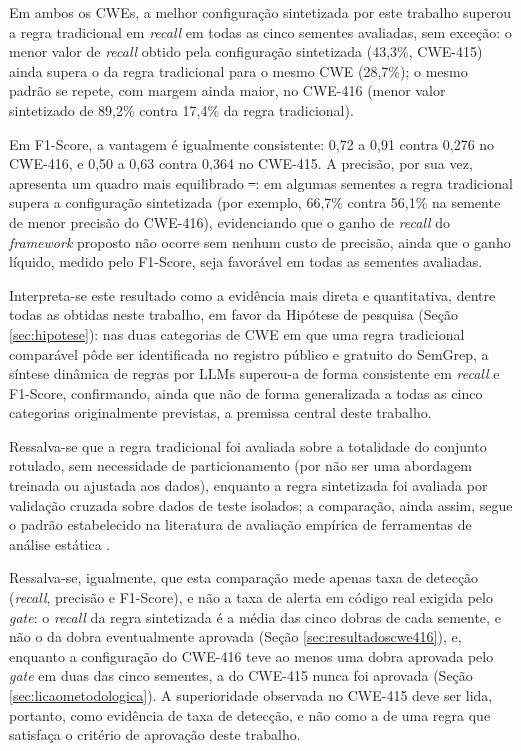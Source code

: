 \documentclass[
    12pt,                %
    openright,           %
    oneside,             %
    a4paper,             %
    english,             %
    brazil               %
]{abntex2}
\newcommand{\antigo}[1]{\sout{#1}}
\newcommand{\novo}[1]{{\color{red}#1}}
\begin{document}
\par
Em ambos os CWEs, a melhor configuração sintetizada por este trabalho superou a regra tradicional em \textit{recall} em todas as cinco sementes avaliadas, sem exceção: o menor valor de \textit{recall} obtido pela configuração sintetizada (43,3\%, CWE-415) ainda supera o da regra tradicional para o mesmo CWE (28,7\%); o mesmo padrão se repete, com margem ainda maior, no CWE-416 (menor valor sintetizado de 89,2\% contra 17,4\% da regra tradicional).
\par
Em F1-Score, a vantagem é igualmente consistente: 0,72 a 0,91 contra 0,276 no CWE-416, e 0,50 a 0,63 contra 0,364 no CWE-415.
A precisão, por sua vez, apresenta um quadro mais equilibrado\antigo{ --}\novo{:} em algumas sementes a regra tradicional supera a configuração sintetizada (por exemplo, 66,7\% contra 56,1\% na semente de menor precisão do CWE-416), evidenciando que o ganho de \textit{recall} do \textit{framework} proposto não ocorre sem nenhum custo de precisão, ainda que o ganho líquido, medido pelo F1-Score, seja favorável em todas as sementes avaliadas.
\par
Interpreta-se este resultado como a evidência mais direta e quantitativa, dentre todas as obtidas neste trabalho, em favor da Hipótese de pesquisa (Seção \ref{sec:hipotese}): nas duas categorias de CWE em que uma regra tradicional comparável pôde ser identificada no registro público e gratuito do SemGrep, a síntese dinâmica de regras por LLMs superou-a de forma consistente em \textit{recall} e F1-Score, confirmando, ainda que não de forma generalizada a todas as cinco categorias originalmente previstas, a premissa central deste trabalho.
\par
Ressalva-se que a regra tradicional foi avaliada sobre a totalidade do conjunto rotulado, sem necessidade de particionamento (por não ser uma abordagem treinada ou ajustada aos dados), enquanto a regra sintetizada foi avaliada por validação cruzada sobre dados de teste isolados; a comparação, ainda assim, segue o padrão estabelecido na literatura de avaliação empírica de ferramentas de análise estática \cite{guo2025repoaudit}.
\par
\novo{Ressalva-se, igualmente, que esta comparação mede apenas taxa de detecção (\textit{recall}, precisão e F1-Score), e não a taxa de alerta em código real exigida pelo \textit{gate}: o \textit{recall} da regra sintetizada é a média das cinco dobras de cada semente, e não o da dobra eventualmente aprovada (Seção \ref{sec:resultadoscwe416}), e, enquanto a configuração do CWE-416 teve ao menos uma dobra aprovada pelo \textit{gate} em duas das cinco sementes, a do CWE-415 nunca foi aprovada (Seção \ref{sec:licaometodologica}). A superioridade observada no CWE-415 deve ser lida, portanto, como evidência de taxa de detecção, e não como a de uma regra que satisfaça o critério de aprovação deste trabalho.}
\end{document}
